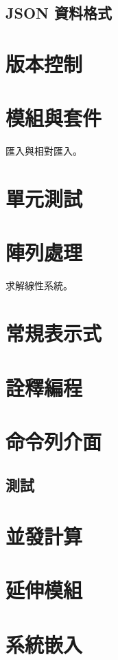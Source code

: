 \documentclass[a4paper,12pt]{book}
\theoremstyle{definition}
\begin{document}
\section{JSON 資料格式}

\chapter{版本控制}
%
\label{c:version}

\chapter{模組與套件}
%
\label{c:module}

匯入與相對匯入。

\chapter{單元測試}
%
\label{c:unittest}

\chapter{陣列處理}
%
\label{c:array}

求解線性系統。

\chapter{常規表示式}
%
\label{c:regexp}

\chapter{詮釋編程}
%
\label{c:meta}

\chapter{命令列介面}
%
\label{c:cmdline}

\section{測試}

\chapter{並發計算}
%
\label{c:concurrency}

\chapter{延伸模組}
%
\label{c:extension}

\chapter{系統嵌入}
%
\label{c:embed}

\backmatter



\end{document}
